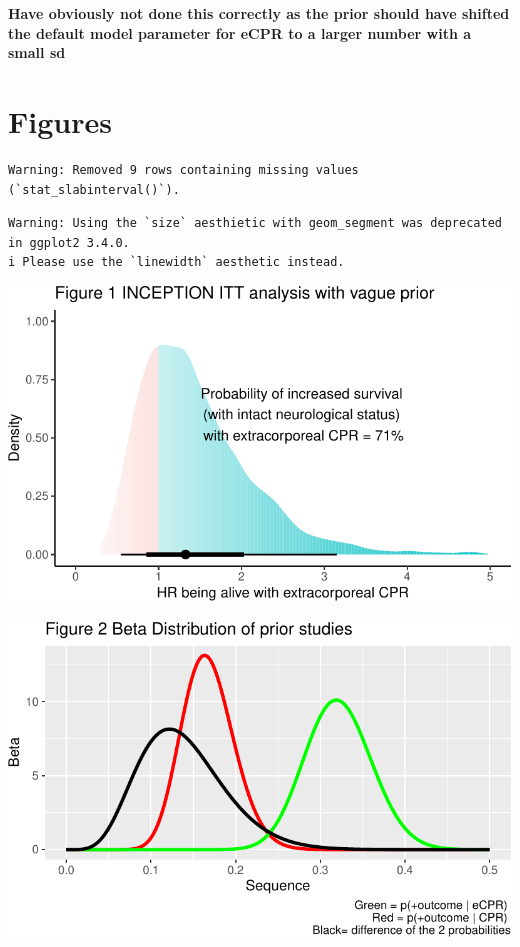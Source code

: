 \documentclass[
  super,
  preprint,
  3p]{elsarticle}
\begin{document}
\textbf{Have obviously not done this correctly as the prior should have
shifted the default model parameter for eCPR to a larger number with a
small sd}

\hypertarget{figures}{%
\section{Figures}\label{figures}}

\begin{verbatim}
Warning: Removed 9 rows containing missing values (`stat_slabinterval()`).
\end{verbatim}

\begin{verbatim}
Warning: Using the `size` aesthietic with geom_segment was deprecated in ggplot2 3.4.0.
i Please use the `linewidth` aesthetic instead.
\end{verbatim}

\includegraphics{manuscript_files/figure-pdf/unnamed-chunk-4-1.pdf}

\includegraphics{manuscript_files/figure-pdf/unnamed-chunk-4-2.pdf}

\newpage


\renewcommand\refname{References}
  
\end{document}
